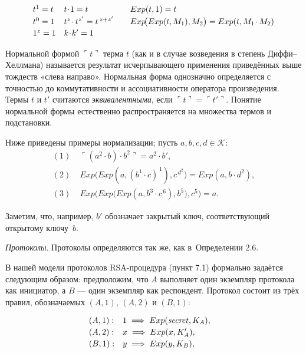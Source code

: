 \[
\begin{array}{@{}ll@{\qquad}l@{}}
t^{1}=t              & t\!\cdot\! 1 = t
                     & Exp(t,1) = t \\[2pt]
t^{0}=1              & t^{z}\!\cdot t^{z'} = t^{\,z+z'}
                     & Exp\!\bigl(Exp(t,M_{1}),M_{2}\bigr)
                       = Exp(t,M_{1}\!\cdot M_{2}) \\[2pt]
1^{z}=1              & k\!\cdot\! k' = 1 &
\end{array}
\]

Нормальной формой $\ulcorner t\urcorner$ терма $t$
(как и в случае возведения в степень Диффи–Хеллмана)
называется результат исчерпывающего применения приведённых выше
тождеств «слева направо».
Нормальная форма однозначно определяется
с точностью до коммутативности и ассоциативности оператора
произведения.  
Термы $t$ и $t'$ считаются \emph{эквивалентными},
если $\ulcorner t\urcorner=\ulcorner t'\urcorner$.
Понятие нормальной формы естественно распространяется
на множества термов и подстановки.

Ниже приведены примеры нормализации; пусть $a,b,c,d\in\mathcal K$:
\[
\begin{aligned}
(1)\;& \ulcorner(a^{2}\!\cdot b)\cdot b^{2}\urcorner = a^{2}\!\cdot b',\\[2pt]
(2)\;& Exp\!\bigl(Exp(a,(b^{1}\!\cdot c)^{\,1}),c^{\,d^{2}}\bigr)
        = Exp(a,b\!\cdot d^{2}),\\[2pt]
(3)\;& Exp\!\bigl(Exp\bigl(Exp(a,b^{3}\!\cdot c^{\,6}),b^{5}\bigr),c^{5}\bigr)=a.
\end{aligned}
\]

Заметим, что, например, $b'$ обозначает
закрытый ключ, соответствующий открытому ключу~$b$.

\textit{Протоколы}. Протоколы определяются так же, как в~Определении 2.6.  

В нашей модели протоколов RSA-процедура (пункт 7.1) формально
задаётся следующим образом:
предположим, что $A$ выполняет один экземпляр протокола как
инициатор, а $B$ — один экземпляр как респондент.
Протокол состоит из трёх правил, обозначаемых
\((A,1)\), \((A,2)\) и \((B,1)\):

\[
\begin{array}{@{}ll@{\quad}l@{}}
(A,1): & 1 \;\Longrightarrow\; Exp(\mathit{secret},K_{A}),\\[2pt]
(A,2): & x \;\Longrightarrow\; Exp(x,K_{A}'),\\[2pt]
(B,1): & y \;\Longrightarrow\; Exp(y,K_{B}),
\end{array}
\]

